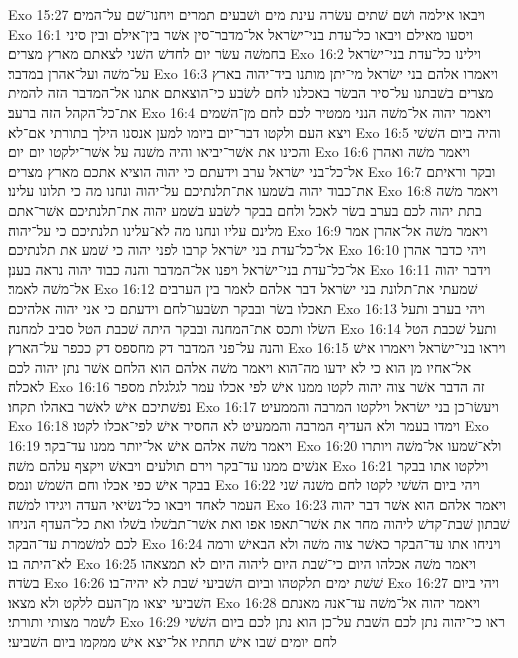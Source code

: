 Exo 15:27  ויבאו אילמה ושׁם שׁתים עשׂרה עינת מים ושׁבעים תמרים ויחנו־שׁם על־המים׃
Exo 16:1  ויסעו מאילם ויבאו כל־עדת בני־ישׂראל אל־מדבר־סין אשׁר בין־אילם ובין סיני בחמשׁה עשׂר יום לחדשׁ השׁני לצאתם מארץ מצרים׃
Exo 16:2  וילינו כל־עדת בני־ישׂראל על־משׁה ועל־אהרן במדבר׃
Exo 16:3  ויאמרו אלהם בני ישׂראל מי־יתן מותנו ביד־יהוה בארץ מצרים בשׁבתנו על־סיר הבשׂר באכלנו לחם לשׂבע כי־הוצאתם אתנו אל־המדבר הזה להמית את־כל־הקהל הזה ברעב׃
Exo 16:4  ויאמר יהוה אל־משׁה הנני ממטיר לכם לחם מן־השׁמים ויצא העם ולקטו דבר־יום ביומו למען אנסנו הילך בתורתי אם־לא׃
Exo 16:5  והיה ביום השׁשׁי והכינו את אשׁר־יביאו והיה משׁנה על אשׁר־ילקטו יום יום׃
Exo 16:6  ויאמר משׁה ואהרן אל־כל־בני ישׂראל ערב וידעתם כי יהוה הוציא אתכם מארץ מצרים׃
Exo 16:7  ובקר וראיתם את־כבוד יהוה בשׁמעו את־תלנתיכם על־יהוה ונחנו מה כי תלונו עלינו׃
Exo 16:8  ויאמר משׁה בתת יהוה לכם בערב בשׂר לאכל ולחם בבקר לשׂבע בשׁמע יהוה את־תלנתיכם אשׁר־אתם מלינם עליו ונחנו מה לא־עלינו תלנתיכם כי על־יהוה׃
Exo 16:9  ויאמר משׁה אל־אהרן אמר אל־כל־עדת בני ישׂראל קרבו לפני יהוה כי שׁמע את תלנתיכם׃
Exo 16:10  ויהי כדבר אהרן אל־כל־עדת בני־ישׂראל ויפנו אל־המדבר והנה כבוד יהוה נראה בענן׃
Exo 16:11  וידבר יהוה אל־משׁה לאמר׃
Exo 16:12  שׁמעתי את־תלונת בני ישׂראל דבר אלהם לאמר בין הערבים תאכלו בשׂר ובבקר תשׂבעו־לחם וידעתם כי אני יהוה אלהיכם׃
Exo 16:13  ויהי בערב ותעל השׂלו ותכס את־המחנה ובבקר היתה שׁכבת הטל סביב למחנה׃
Exo 16:14  ותעל שׁכבת הטל והנה על־פני המדבר דק מחספס דק ככפר על־הארץ׃
Exo 16:15  ויראו בני־ישׂראל ויאמרו אישׁ אל־אחיו מן הוא כי לא ידעו מה־הוא ויאמר משׁה אלהם הוא הלחם אשׁר נתן יהוה לכם לאכלה׃
Exo 16:16  זה הדבר אשׁר צוה יהוה לקטו ממנו אישׁ לפי אכלו עמר לגלגלת מספר נפשׁתיכם אישׁ לאשׁר באהלו תקחו׃
Exo 16:17  ויעשׂו־כן בני ישׂראל וילקטו המרבה והממעיט׃
Exo 16:18  וימדו בעמר ולא העדיף המרבה והממעיט לא החסיר אישׁ לפי־אכלו לקטו׃
Exo 16:19  ויאמר משׁה אלהם אישׁ אל־יותר ממנו עד־בקר׃
Exo 16:20  ולא־שׁמעו אל־משׁה ויותרו אנשׁים ממנו עד־בקר וירם תולעים ויבאשׁ ויקצף עלהם משׁה׃
Exo 16:21  וילקטו אתו בבקר בבקר אישׁ כפי אכלו וחם השׁמשׁ ונמס׃
Exo 16:22  ויהי ביום השׁשׁי לקטו לחם משׁנה שׁני העמר לאחד ויבאו כל־נשׂיאי העדה ויגידו למשׁה׃
Exo 16:23  ויאמר אלהם הוא אשׁר דבר יהוה שׁבתון שׁבת־קדשׁ ליהוה מחר את אשׁר־תאפו אפו ואת אשׁר־תבשׁלו בשׁלו ואת כל־העדף הניחו לכם למשׁמרת עד־הבקר׃
Exo 16:24  ויניחו אתו עד־הבקר כאשׁר צוה משׁה ולא הבאישׁ ורמה לא־היתה בו׃
Exo 16:25  ויאמר משׁה אכלהו היום כי־שׁבת היום ליהוה היום לא תמצאהו בשׂדה׃
Exo 16:26  שׁשׁת ימים תלקטהו וביום השׁביעי שׁבת לא יהיה־בו׃
Exo 16:27  ויהי ביום השׁביעי יצאו מן־העם ללקט ולא מצאו׃
Exo 16:28  ויאמר יהוה אל־משׁה עד־אנה מאנתם לשׁמר מצותי ותורתי׃
Exo 16:29  ראו כי־יהוה נתן לכם השׁבת על־כן הוא נתן לכם ביום השׁשׁי לחם יומים שׁבו אישׁ תחתיו אל־יצא אישׁ ממקמו ביום השׁביעי׃
